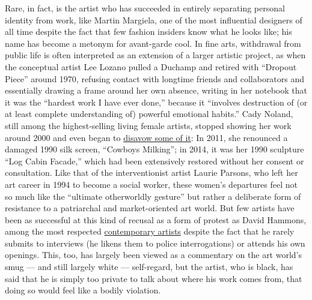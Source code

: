 Rare, in fact, is the artist who has succeeded in entirely separating
personal identity from work, like Martin Margiela, one of the most
influential designers of all time despite the fact that few fashion
insiders know what he looks like; his name has become a metonym for
avant-garde cool. In fine arts, withdrawal from public life is often
interpreted as an extension of a larger artistic project, as when the
conceptual artist Lee Lozano pulled a Duchamp and retired with ``Dropout
Piece'' around 1970, refusing contact with longtime friends and
collaborators and essentially drawing a frame around her own absence,
writing in her notebook that it was the ``hardest work I have ever
done,'' because it ``involves destruction of (or at least complete
understanding of) powerful emotional habits.'' Cady Noland, still among
the highest-selling living female artists, stopped showing her work
around 2000 and even began to
\href{https://www.nytimes3xbfgragh.onion/2019/03/11/t-magazine/artists-destroy-past-work.html}{disavow
some of it}: In 2011, she renounced a damaged 1990 silk screen,
``Cowboys Milking''; in 2014, it was her 1990 sculpture ``Log Cabin
Facade,'' which had been extensively restored without her consent or
consultation. Like that of the interventionist artist Laurie Parsons,
who left her art career in 1994 to become a social worker, these women's
departures feel not so much like the ``ultimate otherworldly gesture''
but rather a deliberate form of resistance to a patriarchal and
market-oriented art world. But few artists have been as successful at
this kind of recusal as a form of protest as David Hammons, among the
most respected
\href{https://www.nytimes3xbfgragh.onion/2019/07/15/t-magazine/most-important-contemporary-art.html}{contemporary
artists} despite the fact that he rarely submits to interviews (he
likens them to police interrogations) or attends his own openings. This,
too, has largely been viewed as a commentary on the art world's smug ---
and still largely white --- self-regard, but the artist, who is black,
has said that he is simply too private to talk about where his work
comes from, that doing so would feel like a bodily violation.

